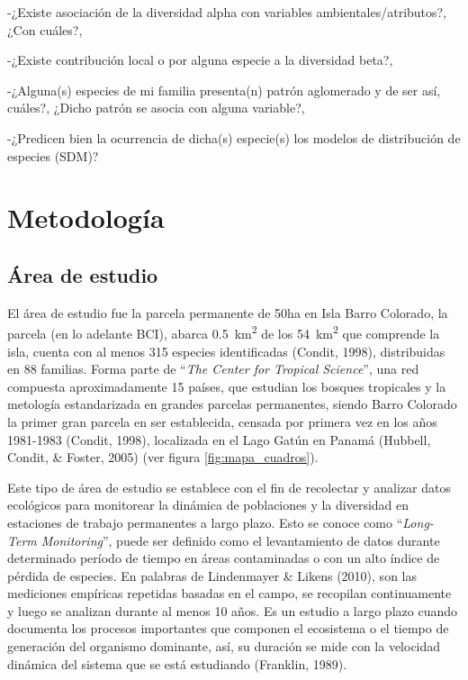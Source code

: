 \documentclass[11pt,]{article}
\begin{document}
-¿Existe asociación de la diversidad alpha con variables
ambientales/atributos?, ¿Con cuáles?,

-¿Existe contribución local o por alguna especie a la diversidad beta?,

-¿Alguna(s) especies de mi familia presenta(n) patrón aglomerado y de
ser así, cuáles?, ¿Dicho patrón se asocia con alguna variable?,

-¿Predicen bien la ocurrencia de dicha(s) especie(s) los modelos de
distribución de especies (SDM)?

\section{Metodología}\label{metodologuxeda}

\subsection{Área de estudio}\label{uxe1rea-de-estudio}

El área de estudio fue la parcela permanente de 50ha en Isla Barro
Colorado, la parcela (en lo adelante BCI), abarca
0.5~km\textsuperscript{2} de los 54~km\textsuperscript{2} que comprende
la isla, cuenta con al menos 315 especies identificadas (Condit, 1998),
distribuidas en 88 familias. Forma parte de ``\emph{The Center for
Tropical Science}'', una red compuesta aproximadamente 15 países, que
estudian los bosques tropicales y la metología estandarizada en grandes
parcelas permanentes, siendo Barro Colorado la primer gran parcela en
ser establecida, censada por primera vez en los años 1981-1983 (Condit,
1998), localizada en el Lago Gatún en Panamá (Hubbell, Condit, \&
Foster, 2005) (ver figura \ref{fig:mapa_cuadros}).

Este tipo de área de estudio se establece con el fin de recolectar y
analizar datos ecológicos para monitorear la dinámica de poblaciones y
la diversidad en estaciones de trabajo permanentes a largo plazo. Esto
se conoce como ``\emph{Long-Term Monitoring}'', puede ser definido como
el levantamiento de datos durante determinado período de tiempo en áreas
contaminadas o con un alto índice de pérdida de especies. En palabras de
Lindenmayer \& Likens (2010), son las mediciones empíricas repetidas
basadas en el campo, se recopilan continuamente y luego se analizan
durante al menos 10 años. Es un estudio a largo plazo cuando documenta
los procesos importantes que componen el ecosistema o el tiempo de
generación del organismo dominante, así, su duración se mide con la
velocidad dinámica del sistema que se está estudiando (Franklin, 1989).
\end{document}
